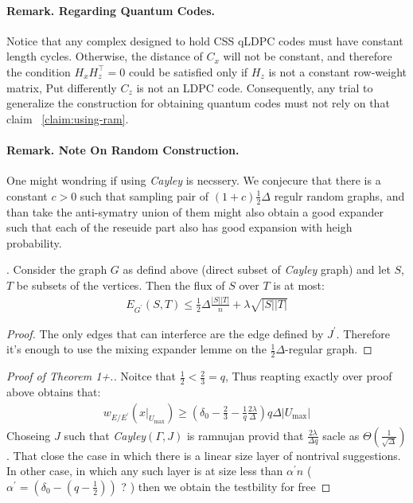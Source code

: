   \paragraph{Remark. Regarding Quantum Codes.} Notice that any complex designed to hold CSS qLDPC codes must have constant length cycles. Otherwise, the distance of $C_{x}$ will not be constant, and therefore the condition $H_{x}H_{z}^{\top} =0$ could be satisfied only if $H_{z}$ is not a constant row-weight matrix, Put differently $C_{z}$ is not an LDPC code. Consequently, any trial to generalize the construction for obtaining quantum codes must not rely on that claim ~\ref{claim:using-ram}.    

  \paragraph{Remark. Note On Random Construction.} One might wondring if using \emph{Cayley} is necssery. We conjecure that there is a constant $c > 0$ such that sampling pair of  $\left( 1 + c \right)\frac{1}{2}\Delta$ regulr random graphs, and than take the anti-symatry union of them might also obtain a good expander such that each of the reseuide part also has good expansion with heigh probability.  
  \begin{lemma} . Consider the graph $G$ as defind above (direct subset of \emph{Cayley} graph) and let $S$, $T$ be subsets of the vertices. Then the flux of $S$ over $T$ is at most: 
  \begin{equation*}
    \begin{split}
      E_{G^{\prime}}(S,T) \le \frac{1}{2} \Delta\frac{|S||T|}{n} + \lambda\sqrt{|S||T|} 
    \end{split}
  \end{equation*} 
\end{lemma}
  \begin{proof} The only edges that can interferce are the edge defined by $J^{\prime}$. Therefore it's enough to use the mixing expander lemme on the $\frac{1}{2}\Delta$-regular graph. \end{proof}


  \begin{proof}[Proof of Theorem 1+.] Noitce that $\frac{1}{2} < \frac{2}{3} = q$, Thus reapting exactly over proof above obtains that: 
  \begin{equation*}
    \begin{split}
      w_{E/E^{\prime}}\left( x|_{U_{\text{max}}} \right) \ge \left( \delta_{0} - \frac{2}{3} - \frac{1}{q}\frac{2\lambda}{\Delta} \right)q\Delta |U_{\text{max}}|
    \end{split}
  \end{equation*}
  Choseing $J$ such that \emph{Cayley}$\left( \Gamma, J \right)$ is ramnujan provid that $ \frac{2\lambda}{\Delta q}$ sacle as $\Theta\left( \frac{1}{\sqrt{\Delta}} \right)$. That close the case in which there is a linear size layer of nontrival suggestions. In other case, in which any such layer is at size less than $\alpha^{\prime}n$ ( $\alpha^{\prime} = \left( \delta_{0} - \left( q - \frac{1}{2} \right) \right)$ ? ) then we obtain the testbility for free
\end{proof}
